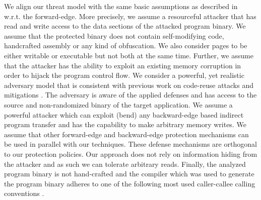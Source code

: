 We align our threat model with the same basic assumptions as described in~\cite{veen:typearmor} w.r.t. the forward-edge.
More precisely, we assume a resourceful attacker that has read and write access to the data 
sections of the attacked program binary. We assume that the protected binary does not contain 
self-modifying code, handcrafted assembly or any kind of obfuscation. We also consider pages 
to be either writable or executable but not both at the same time. Further, we assume 
that the attacker has the ability to exploit an existing memory corruption in order to hijack the program
control flow. 
We consider a powerful, yet realistic adversary
model that is consistent with previous work on code-reuse
attacks and mitigations \cite{volodymyr:cpi}. 
The adversary is aware of the
applied defenses and has access to the source and non-randomized 
binary of the target application.
We assume a powerful attacker which can exploit (bend)
any backward-edge based indirect program transfer and
has the capability to make arbitrary memory writes. 
We assume that other forward-edge and backward-edge protection mechanisms
can be used in parallel with our techniques.
These defense
mechanisms are orthogonal to our protection policies. Our
approach does not rely on information hiding from the
attacker and as such we can tolerate arbitrary reads. 
Finally, the analyzed program binary is not hand-crafted and the compiler which was used
to generate the program binary adheres to one of the 
following most used caller-callee calling conventions \cite{arm:abi, microsoft:abi, itanium:abi}.


